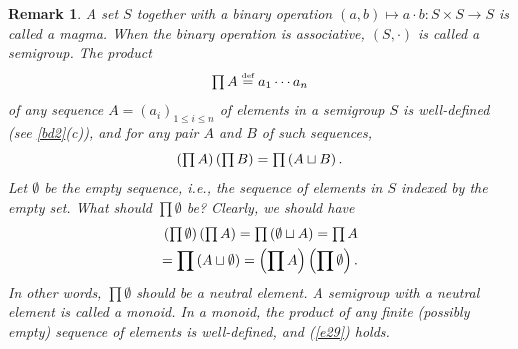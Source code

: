 \documentclass[a4paper,11pt,final]{memoir}%
\newtheorem{remark}[X]{Remark}
\theoremstyle{nonumberplain}
\begin{document}
\begin{remark}
\label{bd3g}A set $S$ together with a binary operation $(a,b)\mapsto a\cdot
b\colon S\times S\rightarrow S$ is called a \emph{magma}. When the binary
operation is associative, $(S,\cdot)$ is called a \emph{semigroup}. The
product%
\[
\tstyle\prod A\overset{\textup{{\tiny def}}}{=}a_{1}\cdots a_{n}%
\]
of any sequence $A=(a_{i})_{1\leq i\leq n}$ of elements in a semigroup $S$ is
well-defined (see \ref{bd2}(c)), and for any pair $A$ and $B$ of such
sequences,%
\begin{equation}
\tstyle\left(  \prod A\right)  \left(  \prod B\right)  =\prod\left(  A\sqcup
B\right)  \text{.} \label{e29}%
\end{equation}
Let $\emptyset$ be the empty sequence, i.e., the sequence of elements in $S$
indexed by the empty set. What should $\prod\emptyset$ be? Clearly, we should
have%
\begin{align*}
\textstyle\left(  \prod\emptyset\right)  \left(  \prod A\right)  =\prod\left(
\emptyset\sqcup A\right)  =\prod A\\
=\prod\left(  A\sqcup\emptyset\right)
=\left(  \prod A\right)  \left(  \prod\emptyset\right)  .
\end{align*}
In other words, $\prod\emptyset$ should be a neutral element. A semigroup with
a neutral element is called a \emph{monoid}. In a monoid, the product of any
finite (possibly empty) sequence of elements is well-defined, and (\ref{e29}) holds.
\end{remark}
\end{document}
